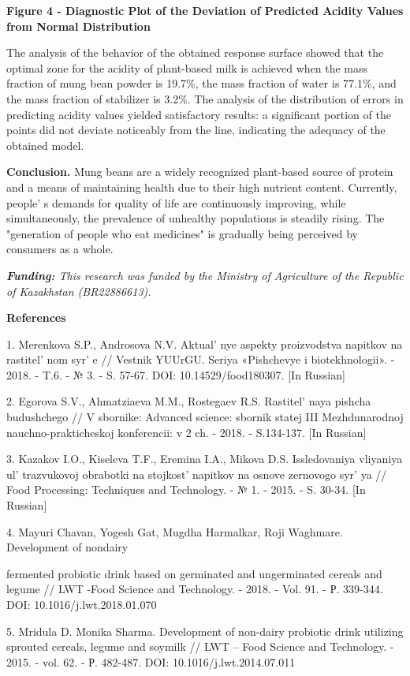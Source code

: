 {\bfseries Figure 4 - Diagnostic Plot of the Deviation of Predicted Acidity
Values from Normal Distribution}

The analysis of the behavior of the obtained response surface showed
that the optimal zone for the acidity of plant-based milk is achieved
when the mass fraction of mung bean powder is 19.7\%, the mass fraction
of water is 77.1\%, and the mass fraction of stabilizer is 3.2\%. The
analysis of the distribution of errors in predicting acidity values
yielded satisfactory results: a significant portion of the points did
not deviate noticeably from the line, indicating the adequacy of the
obtained model.

{\bfseries Conclusion.} Mung beans are a widely recognized plant-based
source of protein and a means of maintaining health due to their high
nutrient content. Currently, people' s demands for
quality of life are continuously improving, while simultaneously, the
prevalence of unhealthy populations is steadily rising. The "generation
of people who eat medicines" is gradually being perceived by consumers
as a whole.

\emph{{\bfseries Funding:} This research was funded by the Ministry of
Agriculture of the Republic of Kazakhstan (BR22886613).}

{\bfseries References}

1. Merenkova S.P., Androsova N.V. Aktual' nye aspekty
proizvodstva napitkov na rastitel' nom
syr' e // Vestnik YUUrGU. Seriya «Pishchevye i
biotekhnologii». - 2018. - T.6. - № 3. - S. 57-67. DOI:
10.14529/food180307. {[}In Russian{]}

2. Egorova S.V., Ahmatziaeva M.M., Rostegaev R.S.
Rastitel' naya pishcha budushchego // V sbornike:
Advanced science: sbornik statej III Mezhdunarodnoj
nauchno-prakticheskoj konferencii: v 2 ch. - 2018. - S.134-137. {[}In
Russian{]}

3. Kazakov I.O., Kiseleva T.F., Eremina I.A., Mikova D.S. Issledovaniya
vliyaniya ul' trazvukovoj obrabotki na
stojkost'{} napitkov na osnove zernovogo
syr' ya // Food Processing: Techniques and Technology. -
№ 1. - 2015. - S. 30-34. {[}In Russian{]}

4. Mayuri Chavan, Yogesh Gat, Mugdha Harmalkar, Roji Waghmare.
Development of nondairy

fermented probiotic drink based on germinated and ungerminated cereals
and legume // LWT -Food Science and Technology. - 2018. - Vol. 91. - Р.
339-344. DOI: 10.1016/j.lwt.2018.01.070

5. Mridula D. Monika Sharma. Development of non-dairy probiotic drink
utilizing sprouted cereals, legume and soymilk // LWT -- Food Science
and Technology. - 2015. - vol. 62. - Р. 482-487. DOI:
10.1016/j.lwt.2014.07.011

